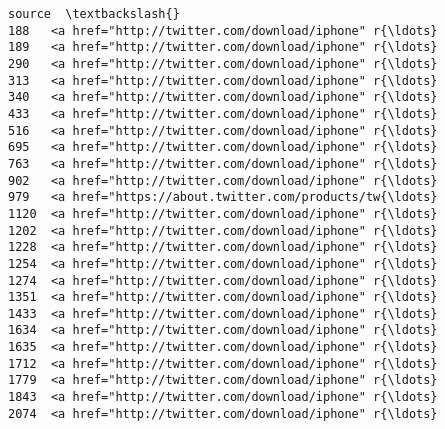 \documentclass[11pt]{article}
\begin{document}
\begin{tcolorbox}[breakable, size=fbox, boxrule=.5pt, pad at break*=1mm, opacityfill=0]
\begin{Verbatim}[commandchars=\\\{\}]
                                                 source  \textbackslash{}
188   <a href="http://twitter.com/download/iphone" r{\ldots}
189   <a href="http://twitter.com/download/iphone" r{\ldots}
290   <a href="http://twitter.com/download/iphone" r{\ldots}
313   <a href="http://twitter.com/download/iphone" r{\ldots}
340   <a href="http://twitter.com/download/iphone" r{\ldots}
433   <a href="http://twitter.com/download/iphone" r{\ldots}
516   <a href="http://twitter.com/download/iphone" r{\ldots}
695   <a href="http://twitter.com/download/iphone" r{\ldots}
763   <a href="http://twitter.com/download/iphone" r{\ldots}
902   <a href="http://twitter.com/download/iphone" r{\ldots}
979   <a href="https://about.twitter.com/products/tw{\ldots}
1120  <a href="http://twitter.com/download/iphone" r{\ldots}
1202  <a href="http://twitter.com/download/iphone" r{\ldots}
1228  <a href="http://twitter.com/download/iphone" r{\ldots}
1254  <a href="http://twitter.com/download/iphone" r{\ldots}
1274  <a href="http://twitter.com/download/iphone" r{\ldots}
1351  <a href="http://twitter.com/download/iphone" r{\ldots}
1433  <a href="http://twitter.com/download/iphone" r{\ldots}
1634  <a href="http://twitter.com/download/iphone" r{\ldots}
1635  <a href="http://twitter.com/download/iphone" r{\ldots}
1712  <a href="http://twitter.com/download/iphone" r{\ldots}
1779  <a href="http://twitter.com/download/iphone" r{\ldots}
1843  <a href="http://twitter.com/download/iphone" r{\ldots}
2074  <a href="http://twitter.com/download/iphone" r{\ldots}


\end{Verbatim}
\end{tcolorbox}
\end{document}

